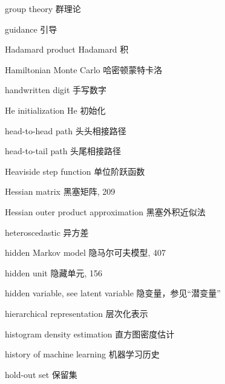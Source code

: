 group theory 群理论\par
guidance 引导\par
Hadamard product Hadamard 积\par
Hamiltonian Monte Carlo 哈密顿蒙特卡洛\par
handwritten digit 手写数字\par
He initialization He 初始化\par
head-to-head path 头头相接路径\par
head-to-tail path 头尾相接路径\par
Heaviside step function 单位阶跃函数\par
Hessian matrix 黑塞矩阵, 209\par
Hessian outer product approximation 黑塞外积近似法\par
heteroscedastic 异方差\par
hidden Markov model 隐马尔可夫模型, 407\par
hidden unit 隐藏单元, 156\par
hidden variable, see latent variable 隐变量，参见“潜变量”\par
hierarchical representation 层次化表示\par
histogram density estimation 直方图密度估计\par
history of machine learning 机器学习历史\par
hold-out set 保留集\par


